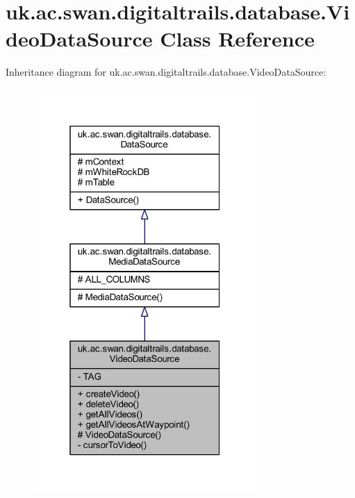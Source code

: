 \hypertarget{classuk_1_1ac_1_1swan_1_1digitaltrails_1_1database_1_1_video_data_source}{\section{uk.\+ac.\+swan.\+digitaltrails.\+database.\+Video\+Data\+Source Class Reference}
\label{classuk_1_1ac_1_1swan_1_1digitaltrails_1_1database_1_1_video_data_source}
}


Inheritance diagram for uk.\+ac.\+swan.\+digitaltrails.\+database.\+Video\+Data\+Source\+:
\nopagebreak
\begin{figure}[H]
\begin{center}
\leavevmode
\includegraphics[width=241pt]{classuk_1_1ac_1_1swan_1_1digitaltrails_1_1database_1_1_video_data_source__inherit__graph}
\end{center}
\end{figure}


